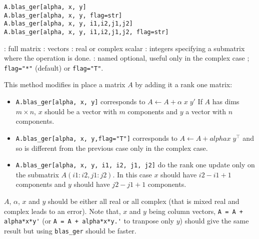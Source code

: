 \begin{mandesc}
\end{mandesc}
\begin{calling_sequence}
\begin{verbatim}
A.blas_ger[alpha, x, y] 
A.blas_ger[alpha, x, y, flag=str]
A.blas_ger[alpha, x, y, i1,i2,j1,j2]
A.blas_ger[alpha, x, y, i1,i2,j1,j2, flag=str]
\end{verbatim}
\end{calling_sequence}
\begin{parameters}
  \begin{varlist}
    : full matrix
    : vectors
    : real or complex scalar
    : integers specifying a submatrix where the operation is done.
    : named optional, useful only in the complex case ; \verb+flag="*"+ (default)
                     or \verb+flag="T"+.
  \end{varlist}
\end{parameters}

\begin{mandescription}

This method modifies in place a matrix $A$ by adding it a rank one matrix:
\begin{itemize}
\item \verb+A.blas_ger[alpha, x, y]+ corresponds to  $A \leftarrow A + \alpha \; x \; y'$
      If $A$ has dims $m \times n$, $x$ should be a vector with $m$ components
      and $y$ a vector with $n$ components.
\item \verb+A.blas_ger[alpha, x, y,flag="T"]+ corresponds to  $A \leftarrow A + alpha x \; y^{\top}$
      and so is different from the previous case only in the complex case.
\item \verb+A.blas_ger[alpha, x, y, i1, i2, j1, j2]+ do the rank one update only on the
      submatrix $A(i1:i2,j1:j2)$. In this case $x$ should have $i2-i1+1$ components 
      and $y$ should have $j2-j1+1$ components.
\end{itemize}
$A$, $\alpha$, $x$ and $y$ should be either all real or all complex (that is mixed real and complex 
leads to an error). Note that, $x$ and $y$ being column vectors, \verb-A = A + alpha*x*y'- 
(or \verb-A = A + alpha*x*y.'- to tranpose only $y$) should give the same result but 
using \verb+blas_ger+ should be faster. 

\end{mandescription}


